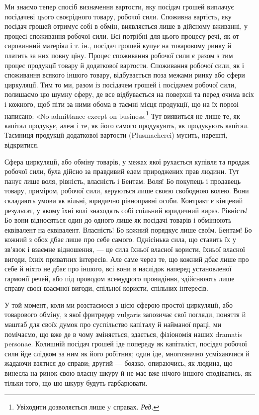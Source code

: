 Ми знаємо тепер спосіб визначення вартости, яку посідач
грошей виплачує посідачеві цього своєрідного товару, робочої
сили. Споживна вартість, яку посідач грошей отримує собі в
обмін, виявляється лише в дійсному вживанні, у процесі споживання
робочої сили. Всі потрібні для цього процесу речі, як от
сировинний матеріял і т. ін., посідач грошей купує на товаровому
ринку й платить за них повну ціну. Процес споживання
робочої сили є разом з тим процес продукції товару й додаткової
вартости. Споживання робочої сили, як і споживання всякого
іншого товару, відбувається поза межами ринку або сфери циркуляції.
Тим то ми, разом із посідачем грошей і посідачем робочої
сили, полишаємо цю шумну сферу, де все відбувається на поверхні
та перед очима всіх і кожного, щоб піти за ними обома в таємні
місця продукції, що на їх порозі написано: «No admittance except
on business.\footnote*{
Увіходити дозволяється лише y справах. \emph{Ред.}
} Тут виявиться не лише те, як капітал продукує,
алеж і те, як його самого продукують, як продукують капітал.
Таємниця продукції додаткової вартости (Plusmacherei) мусить,
нарешті, відкритися.

Сфера циркуляції, або обміну товарів, у межах якої рухається
купівля та продаж робочої сили, була дійсно за правдивий
едем природжених прав людини. Тут панує лише воля, рівність,
власність і Бентам. Воля! Бо покупець і продавець товару, приміром,
робочої сили, керуються лише своєю свободною волею.
Вони складають умови як вільні, юридично рівноправні особи.
Контракт є кінцевий результат, у якому їхні волі знаходять собі
спільний юридичний вираз. Рівність! Бо вони відносяться один
до одного лише як посідачі товарів і обмінюють еквівалент на
еквівалент. Власність! Бо кожний порядкує лише своїм. Бентам!
Бо кожний з обох дбає лише про себе самого. Однісінька
сила, що ставить їх у зв’язок і взаємне відношення, — це сила
їхньої власної користи, їхньої власної вигоди, їхніх приватних
інтересів. Але саме через те, що кожний дбає лише про себе й
ніхто не дбає про іншого, всі вони в наслідок наперед установленої
гармонії речей, або під проводом всемудрого провидіння,
здійснюють лише справу своєї взаємної вигоди, спільної користи,
спільних інтересів.

У той момент, коли ми розстаємося з цією сферою простої
циркуляції, або товарового обміну, з якої фритредер vulgaris
запозичає свої погляди, поняття й маштаб для своїх думок про
суспільство капіталу й найманої праці, ми помічаємо, що вже де
в чому зміняється, здається, фізіономія наших dramatis personae.
Колишній посідач грошей іде попереду як капіталіст, посідач
робочої сили йде слідком за ним як його робітник; один іде,
многозначно усміхаючися й жадаючи взятися до справи; другий —
боязко, опираючись, як людина, що винесла на ринок свою власну
шкуру й не має вже нічого іншого сподіватись, як тільки того,
що цю шкуру будуть гарбарювати.

